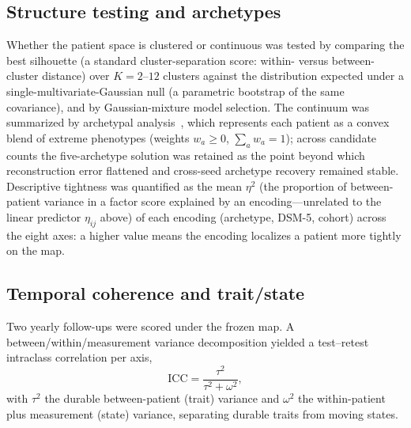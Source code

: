 \subsection{Structure testing and archetypes}
Whether the patient space is clustered or continuous was tested by comparing the best silhouette
(a standard cluster-separation score: within- versus between-cluster distance) over $K=2$--$12$
clusters against the distribution expected under a single-multivariate-Gaussian null (a parametric
bootstrap of the same covariance), and by Gaussian-mixture model selection. The continuum was
summarized by archetypal analysis~\citep{cutler1994archetypal}, which represents each patient as a
convex blend of extreme phenotypes (weights $w_a\ge 0$, $\sum_a w_a=1$); across candidate counts the
five-archetype solution was retained as the point beyond which reconstruction error flattened and
cross-seed archetype recovery remained stable. Descriptive tightness was quantified as the mean $\eta^{2}$ (the proportion of
between-patient variance in a factor score explained by an encoding---unrelated to the linear
predictor $\eta_{ij}$ above) of each encoding (archetype, DSM-5, cohort) across the eight axes: a
higher value means the encoding localizes a patient more tightly on the map.

\subsection{Temporal coherence and trait/state}
Two yearly follow-ups were scored under the frozen map. A between/within/measurement variance
decomposition yielded a test--retest intraclass correlation per axis,
\begin{equation}
\mathrm{ICC}=\frac{\tau^{2}}{\tau^{2}+\omega^{2}},
\label{eq:m-icc}
\end{equation}
with $\tau^{2}$ the durable between-patient (trait) variance and $\omega^{2}$ the within-patient
plus measurement (state) variance, separating durable traits from moving states.

